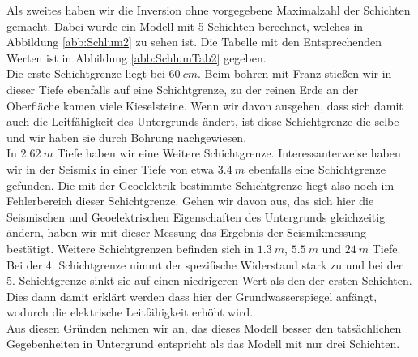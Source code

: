 Als zweites haben wir die Inversion ohne vorgegebene Maximalzahl der Schichten gemacht. Dabei wurde ein Modell mit 5 Schichten berechnet, welches in Abbildung \ref{abb:Schlum2} zu sehen ist. Die Tabelle mit den Entsprechenden Werten ist in Abbildung \ref{abb:SchlumTab2} gegeben. \\
Die erste Schichtgrenze liegt bei $\SI{60}{cm}$. Beim bohren mit Franz stießen wir in dieser Tiefe ebenfalls auf eine Schichtgrenze, zu der reinen Erde an der Oberfläche kamen viele Kieselsteine. Wenn wir davon ausgehen, dass sich damit auch die Leitfähigkeit des Untergrunds ändert, ist diese Schichtgrenze die selbe und wir haben sie durch Bohrung nachgewiesen.\\
  
In $\SI{2,62}{m}$ Tiefe haben wir eine Weitere Schichtgrenze. Interessanterweise haben wir in der Seismik in einer Tiefe von etwa $\SI{3,4 }{m}$ ebenfalls eine Schichtgrenze gefunden. Die mit der Geoelektrik bestimmte Schichtgrenze liegt also noch im Fehlerbereich dieser Schichtgrenze. 
Gehen wir davon aus, das sich hier die Seismischen und Geoelektrischen Eigenschaften des Untergrunds gleichzeitig ändern, haben wir mit dieser Messung das Ergebnis der Seismikmessung bestätigt. 
Weitere Schichtgrenzen befinden sich in $\SI{1,3}{m}$, $\SI{5,5}{m}$ und $\SI{24}{m}$ Tiefe. Bei der 4. Schichtgrenze nimmt der spezifische Widerstand stark zu und bei der 5. Schichtgrenze sinkt sie auf einen niedrigeren Wert als den der ersten Schichten. Dies dann damit erklärt werden dass hier der Grundwasserspiegel anfängt, wodurch die elektrische Leitfähigkeit erhöht wird.\\
Aus diesen Gründen nehmen wir an, das dieses Modell besser den tatsächlichen Gegebenheiten in Untergrund entspricht als das Modell mit nur drei Schichten.


